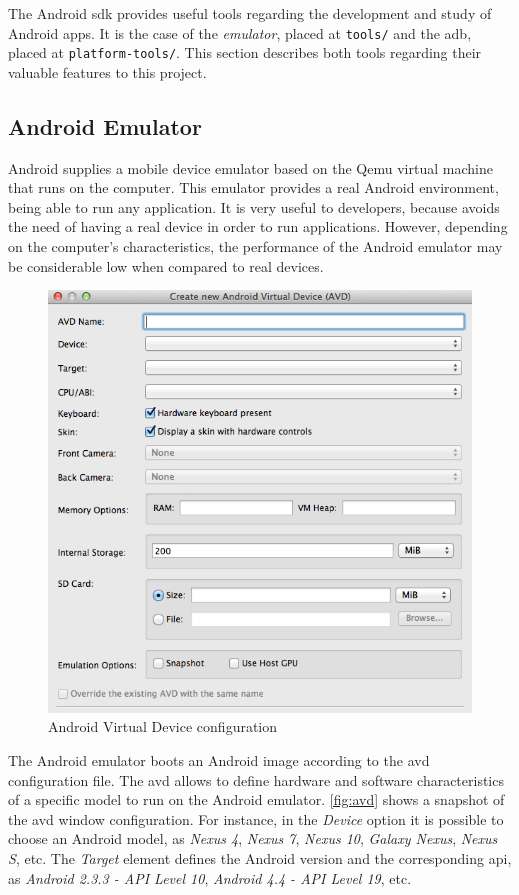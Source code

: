 The Android \gls{sdk} provides useful tools regarding the development and study of Android apps. It is the case of the \textit{emulator}, placed at \texttt{tools/} and the \gls{adb}, placed at \texttt{platform-tools/}. This section describes both tools regarding their valuable features to this project.

\subsection{Android Emulator}

Android supplies a mobile device emulator based on the Qemu virtual machine that runs on the computer. This emulator provides a real Android environment, being able to run any application. It is very useful to developers, because avoids the need of having a real device in order to run applications. However, depending on the computer's characteristics, the performance of the Android emulator may be considerable low when compared to real devices.

\begin{figure}[h]
 \centering
 \includegraphics[scale=0.5]{figures/avd.png}
 \caption{Android Virtual Device configuration}
 \label{fig:avd}
\end{figure}

The Android emulator boots an Android image according to the \gls{avd} configuration file. The \gls{avd} allows to define hardware and software characteristics of a specific model to run on the Android emulator. \autoref{fig:avd} shows a snapshot of the \gls{avd} window configuration. For instance, in the \textit{Device} option it is possible to choose an Android model, as \textit{Nexus 4}, \textit{Nexus 7}, \textit{Nexus 10}, \textit{Galaxy Nexus}, \textit{Nexus S}, etc. The \textit{Target} element defines the Android version and the corresponding \gls{api}, as \textit{Android 2.3.3 - API Level 10}, \textit{Android 4.4 - API Level 19}, etc.

